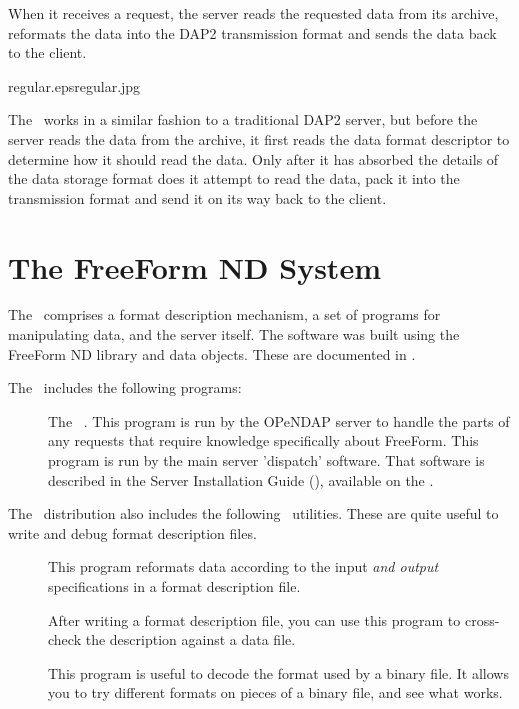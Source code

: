 When it receives a request, the server reads the requested data from
its archive, reformats the data into the DAP2 transmission format and
sends the data back to the client.

{regular.eps}{regular.jpg}{}

The \ffs\ works in a similar fashion to a traditional DAP2 server, but
before the server reads the data from the archive, it first reads the
data format descriptor to determine how it should read the data.  Only
after it has absorbed the details of the data storage format does it
attempt to read the data, pack it into the transmission format and
send it on its way back to the client.


\section{The FreeForm ND System}

The \ffs\ comprises a format description mechanism, a set of programs
for manipulating data, and the server itself.  The software was built
using the FreeForm ND library and data objects.  These are documented
in \ffbook .

The \ffs\ includes the following programs:

\begin{description}
\item[] The \ffs\ . This program
  is run by the OPeNDAP server to handle the parts of any requests
  that require knowledge specifically about FreeForm. This program is
  run by the main server 'dispatch' software. That software is
  described in the Server Installation Guide (\OPDinstallUrl),
  available on the \DODShome .
\end{description}

The \ffs\ distribution also includes the following \ffnd\ utilities.
These are quite useful to write and debug format description files.

\begin{description}
\item[] This program reformats data according to the
  input \emph{and output} specifications in a format description file.

\item[] After writing a format description file, you can
  use this program to cross-check the description against a data file.

\item[] This program is useful to decode the format used
  by a binary file.  It allows you to try different formats on pieces
  of a binary file, and see what works.
\end{description}


